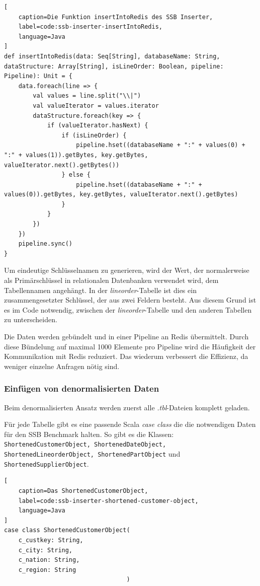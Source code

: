 \begin{lstlisting}[
    caption=Die Funktion insertIntoRedis des SSB Inserter,
    label=code:ssb-inserter-insertIntoRedis,
    language=Java
]
def insertIntoRedis(data: Seq[String], databaseName: String, dataStructure: Array[String], isLineOrder: Boolean, pipeline: Pipeline): Unit = {
	data.foreach(line => {
		val values = line.split("\\|")
		val valueIterator = values.iterator
		dataStructure.foreach(key => {
			if (valueIterator.hasNext) {
				if (isLineOrder) {
					pipeline.hset((databaseName + ":" + values(0) + ":" + values(1)).getBytes, key.getBytes, valueIterator.next().getBytes())
				} else {
					pipeline.hset((databaseName + ":" + values(0)).getBytes, key.getBytes, valueIterator.next().getBytes)
				}
			}
		})
	})
	pipeline.sync()
}
\end{lstlisting}

Um eindeutige Schlüsselnamen zu generieren, wird der Wert, der normalerweise als Primärschlüssel in relationalen Datenbanken verwendet wird, dem Tabellennamen angehängt. In der \emph{lineorder}-Tabelle ist dies ein zusammengesetzter Schlüssel, der aus zwei Feldern besteht. Aus diesem Grund ist es im Code notwendig, zwischen der \emph{lineorder}-Tabelle und den anderen Tabellen zu unterscheiden.

Die Daten werden gebündelt und in einer Pipeline an Redis übermittelt. Durch diese Bündelung auf maximal 1000 Elemente pro Pipeline wird die Häufigkeit der Kommunikation mit Redis reduziert. Das wiederum verbessert die Effizienz, da weniger einzelne Anfragen nötig sind.


\subsubsection{Einfügen von denormalisierten Daten}
Beim denormalisierten Ansatz werden zuerst alle \emph{.tbl}-Dateien komplett geladen.

Für jede Tabelle gibt es eine passende Scala \emph{case class} die die notwendigen Daten für den SSB Benchmark halten. So gibt es die Klassen: \lstinline|ShortenedCustomerObject, ShortenedDateObject, ShortenedLineorderObject, ShortenedPartObject| und \lstinline|ShortenedSupplierObject|.

\begin{lstlisting}[
    caption=Das ShortenedCustomerObject,
    label=code:ssb-inserter-shortened-customer-object,
    language=Java
]
case class ShortenedCustomerObject(
	c_custkey: String,
	c_city: String,
	c_nation: String,
	c_region: String
								  )
\end{lstlisting}


